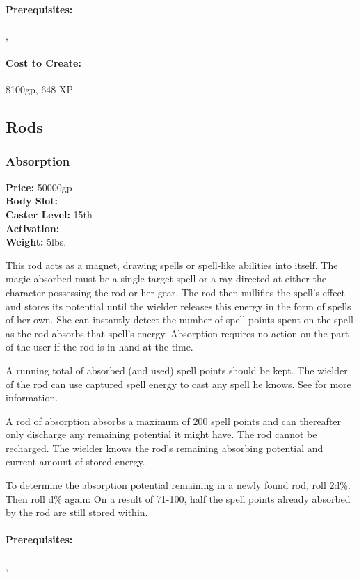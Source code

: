 \paragraph{Prerequisites:} , 

\paragraph{Cost to Create:} 8100gp, 648 XP
\subsection{Rods}
\subsubsection{Absorption}
\textbf{Price:} 50000gp\\
\textbf{Body Slot:} -\\
\textbf{Caster Level:} 15th\\
\textbf{Activation:} -\\
\textbf{Weight:} 5lbs.

This rod acts as a magnet, drawing spells or spell-like abilities into itself. 
The magic absorbed must be a single-target spell or a ray directed at either the character possessing the rod or her gear. 
The rod then nullifies the spell's effect and stores its potential until the wielder releases this energy in the form of spells of her own. 
She can instantly detect the number of spell points spent on the spell as the rod absorbs that spell's energy. 
Absorption requires no action on the part of the user if the rod is in hand at the time.

A running total of absorbed (and used) spell points should be kept. 
The wielder of the rod can use captured spell energy to cast any spell he knows.
See  for more information.

A rod of absorption absorbs a maximum of 200 spell points and can thereafter only discharge any remaining potential it might have. The rod cannot be recharged. The wielder knows the rod's remaining absorbing potential and current amount of stored energy.

To determine the absorption potential remaining in a newly found rod, roll 2d\%. Then roll d\% again: On a result of 71-100, half the spell points already absorbed by the rod are still stored within.

\paragraph{Prerequisites:} , 

